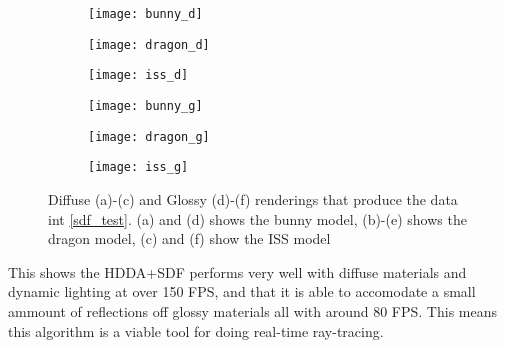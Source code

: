 \begin{figure}[H]
  \centering
  \begin{subfigure}[b]{0.3\textwidth}
    \texttt{[image: bunny\_d]}
    \caption{}
  \end{subfigure}
  \hfill
  \begin{subfigure}[b]{0.3\textwidth}
    \texttt{[image: dragon\_d]}
    \caption{}
  \end{subfigure}
  \hfill
  \begin{subfigure}[b]{0.3\textwidth}
    \texttt{[image: iss\_d]}
    \caption{}
  \end{subfigure}
  \hfill
  \begin{subfigure}[b]{0.3\textwidth}
    \texttt{[image: bunny\_g]}
    \caption{}
  \end{subfigure}
  \hfill
  \begin{subfigure}[b]{0.3\textwidth}
    \texttt{[image: dragon\_g]}
    \caption{}
  \end{subfigure}
  \hfill
  \begin{subfigure}[b]{0.3\textwidth}
    \texttt{[image: iss\_g]}
    \caption{}
  \end{subfigure}
  \caption{Diffuse (a)-(c) and Glossy (d)-(f) renderings that produce the data int \cref{sdf_test}. (a) and (d) shows the bunny model, (b)-(e) shows the dragon model, (c) and (f) show the ISS model}
\end{figure}

This shows the HDDA+SDF performs very well with diffuse materials and dynamic lighting at over 150 FPS, and that it is able to accomodate a small ammount of reflections off glossy materials all with around 80 FPS. This means this algorithm is a viable tool for doing real-time ray-tracing.
